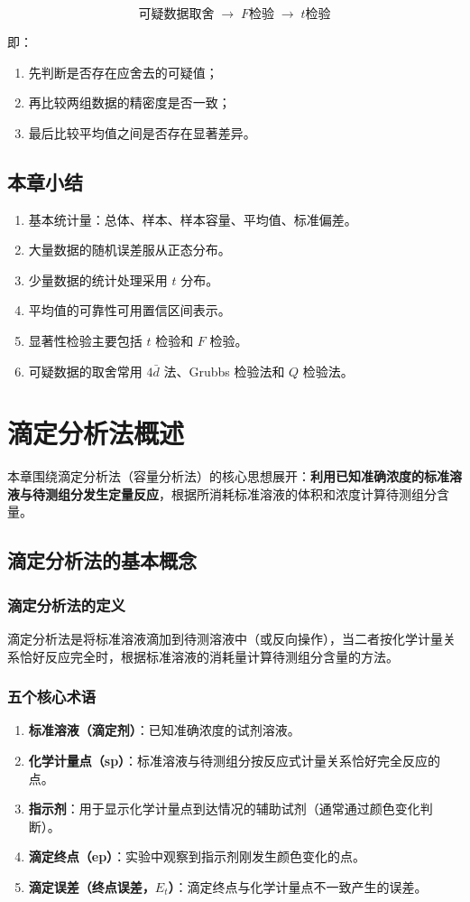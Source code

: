 \documentclass[12pt,a4paper]{article}
\numberwithin{equation}{section}
\newcommand{\summarytitle}{\subsection*{本章小结}}
\begin{document}
\begin{equation}
\text{可疑数据取舍} \;\longrightarrow\; F\text{检验} \;\longrightarrow\; t\text{检验}
\end{equation}

即：
\begin{enumerate}
    \item 先判断是否存在应舍去的可疑值；
    \item 再比较两组数据的精密度是否一致；
    \item 最后比较平均值之间是否存在显著差异。
\end{enumerate}

\summarytitle

\begin{enumerate}
    \item 基本统计量：总体、样本、样本容量、平均值、标准偏差。
    \item 大量数据的随机误差服从正态分布。
    \item 少量数据的统计处理采用 $t$ 分布。
    \item 平均值的可靠性可用置信区间表示。
    \item 显著性检验主要包括 $t$ 检验和 $F$ 检验。
    \item 可疑数据的取舍常用 $4\bar{d}$ 法、Grubbs 检验法和 $Q$ 检验法。
\end{enumerate}
\newpage
\section{滴定分析法概述}

本章围绕滴定分析法（容量分析法）的核心思想展开：\textbf{利用已知准确浓度的标准溶液与待测组分发生定量反应}，根据所消耗标准溶液的体积和浓度计算待测组分含量。

\subsection{滴定分析法的基本概念}

\subsubsection{滴定分析法的定义}
滴定分析法是将标准溶液滴加到待测溶液中（或反向操作），当二者按化学计量关系恰好反应完全时，根据标准溶液的消耗量计算待测组分含量的方法。

\subsubsection{五个核心术语}
\begin{enumerate}
    \item \textbf{标准溶液（滴定剂）}：已知准确浓度的试剂溶液。
    \item \textbf{化学计量点（sp）}：标准溶液与待测组分按反应式计量关系恰好完全反应的点。
    \item \textbf{指示剂}：用于显示化学计量点到达情况的辅助试剂（通常通过颜色变化判断）。
    \item \textbf{滴定终点（ep）}：实验中观察到指示剂刚发生颜色变化的点。
    \item \textbf{滴定误差（终点误差，$E_t$）}：滴定终点与化学计量点不一致产生的误差。
\end{enumerate}
\end{document}
